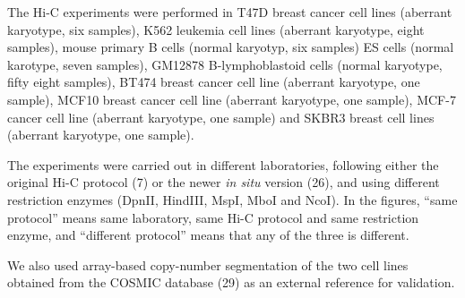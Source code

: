 \documentclass[a4,center,fleqn]{NAR}
\providecommand{\DIFadd}[1]{{\protect\color{red}#1}} %
\providecommand{\DIFdel}[1]{{\protect}}                      %
\providecommand{\DIFaddbegin}{} %
\providecommand{\DIFaddend}{} %
\providecommand{\DIFdelbegin}{} %
\providecommand{\DIFdelend}{} %
\begin{document}
\DIFdelbegin \DIFdel{We used several experiments comprising }\DIFdelend \DIFaddbegin \DIFadd{The Hi-C experiments were performed in }\DIFaddend T47D breast cancer cell lines
(\DIFdelbegin \DIFdel{7
}\DIFdelend \DIFaddbegin \DIFadd{aberrant karyotype, six }\DIFaddend samples), K562 leukemia cell lines (\DIFdelbegin \DIFdel{4 }\DIFdelend \DIFaddbegin \DIFadd{aberrant
karyotype, eight }\DIFaddend samples), \DIFdelbegin \DIFdel{both with aberrant
karyotypes; and }\DIFdelend mouse primary B cells (\DIFdelbegin \DIFdel{6 samples) and }\DIFdelend \DIFaddbegin \DIFadd{normal karyotyp, six
samples) }\DIFaddend ES cells (\DIFdelbegin \DIFdel{7
}\DIFdelend \DIFaddbegin \DIFadd{normal karotype, seven }\DIFaddend samples), \DIFdelbegin \DIFdel{both with normal diploid karyotypes.
}\DIFdelend \DIFaddbegin \DIFadd{GM12878
B-lymphoblastoid cells (normal karyotype, fifty eight samples), BT474
breast cancer cell line (aberrant karyotype, one sample), MCF10 breast
cancer cell line (aberrant karyotype, one sample), MCF-7 cancer cell line
(aberrant karyotype, one sample) and SKBR3 breast cell lines (aberrant
karyotype, one sample).
}

\DIFaddend The experiments were carried out in different laboratories, following
either the original Hi-C protocol (7) or
the newer \textit{in situ} version (26), and using different
restriction enzymes (DpnII, HindIII, \DIFaddbegin \DIFadd{MspI, }\DIFaddend MboI and NcoI). \DIFaddbegin \DIFadd{In the figures,
``same protocol'' means same laboratory, same Hi-C protocol and same
restriction enzyme, and ``different protocol'' means that any of the three
is different.
}

\DIFaddend We also used array-based copy-number segmentation of the two cell lines
obtained from the COSMIC database (\DIFdelbegin \DIFdel{30) }\DIFdelend \DIFaddbegin \DIFadd{29) as an external
reference for validation}\DIFaddend .


\DIFdelbegin %
\end{document}
